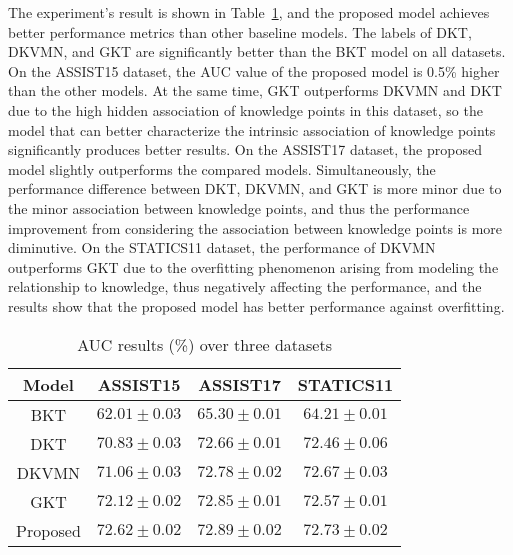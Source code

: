 The experiment's result is shown in Table~\ref{tbl:ch3-tb2}, and the proposed model achieves better performance metrics than other baseline models. The labels of DKT, DKVMN, and GKT are significantly better than the BKT model on all datasets. On the ASSIST15 dataset, the AUC value of the proposed model is 0.5\% higher than the other models. At the same time, GKT outperforms DKVMN and DKT due to the high hidden association of knowledge points in this dataset, so the model that can better characterize the intrinsic association of knowledge points significantly produces better results. On the ASSIST17 dataset, the proposed model slightly outperforms the compared models. Simultaneously, the performance difference between DKT, DKVMN, and GKT is more minor due to the minor association between knowledge points, and thus the performance improvement from considering the association between knowledge points is more diminutive. On the STATICS11 dataset, the performance of DKVMN outperforms GKT due to the overfitting phenomenon arising from modeling the relationship to knowledge, thus negatively affecting the performance, and the results show that the proposed model has better performance against overfitting.

\begin{table}[htbp!]
	\centering
	\caption{AUC results (\%) over three datasets}\label{tbl:ch3-tb2}
	\begin{tabular}{cccc}
		\toprule
		Model    & ASSIST15                    & ASSIST17                   & STATICS11                  \\
		\midrule
		BKT      & \(62.01\pm 0.03 \)          & \(65.30\pm 0.01\)          & \(64.21\pm 0.01\)          \\
		DKT      & \(70.83\pm 0.03 \)          & \(72.66\pm 0.01\)          & \(72.46\pm 0.06\)          \\
		DKVMN    & \(71.06\pm 0.03 \)          & \(72.78\pm 0.02\)          & \(72.67\pm 0.03\)          \\
		GKT      & \(72.12\pm 0.02 \)          & \(72.85\pm 0.01\)          & \(72.57\pm 0.01\)          \\
		\midrule
		Proposed & \(\mathbf{72.62\pm 0.02} \) & \(\mathbf{72.89\pm 0.02}\) & \(\mathbf{72.73\pm 0.02}\) \\
		\bottomrule
	\end{tabular}
\end{table}
